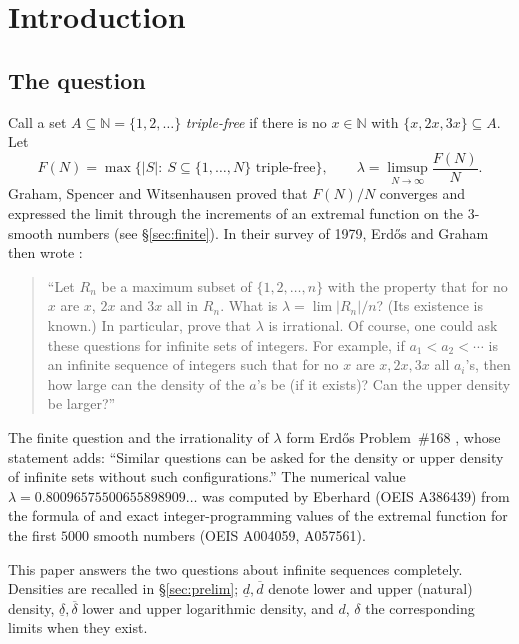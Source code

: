 \documentclass[11pt]{amsart}
\theoremstyle{definition}
\newcommand{\N}{\mathbb{N}}
\newcommand{\dlow}{\underline{d}}
\newcommand{\dup}{\overline{d}}
\newcommand{\llow}{\underline{\delta}}
\newcommand{\lup}{\overline{\delta}}
\begin{document}
\maketitle

\setcounter{tocdepth}{1}
\tableofcontents

\section{Introduction}\label{sec:intro}

\subsection{The question}
Call a set $A\subseteq\N=\{1,2,\dots\}$ \emph{triple-free} if there is no $x\in\N$ with $\{x,2x,3x\}\subseteq A$. Let
\[
F(N)=\max\{|S|:\ S\subseteq\{1,\dots,N\}\text{ triple-free}\},\qquad \lambda=\limsup_{N\to\infty}\frac{F(N)}N .
\]
Graham, Spencer and Witsenhausen \cite{GSW77} proved that $F(N)/N$ converges and expressed the limit through the increments of an extremal function on the $3$-smooth numbers (see \S\ref{sec:finite}). In their survey of 1979, Erd\H{o}s and Graham then wrote \cite[p.~336]{EG79}:

\begin{quote}\small
``Let $R_n$ be a maximum subset of $\{1,2,\dots,n\}$ with the property that for no $x$ are $x$, $2x$ and $3x$ all in $R_n$. What is $\lambda=\lim |R_n|/n$? (Its existence is known.) In particular, prove that $\lambda$ is irrational. Of course, one could ask these questions for infinite sets of integers. For example, if $a_1<a_2<\cdots$ is an infinite sequence of integers such that for no $x$ are $x,2x,3x$ all $a_i$'s, then how large can the density of the $a$'s be (if it exists)? Can the upper density be larger?''
\end{quote}

The finite question and the irrationality of $\lambda$ form Erd\H{o}s Problem~\#168 \cite{EP168}, whose statement adds: ``Similar questions can be asked for the density or upper density of infinite sets without such configurations.'' The numerical value $\lambda=0.80096575500655898909\ldots$ was computed by Eberhard (OEIS A386439) from the formula of \cite{GSW77} and exact integer-programming values of the extremal function for the first $5000$ smooth numbers (OEIS A004059, A057561).

This paper answers the two questions about infinite sequences completely. Densities are recalled in \S\ref{sec:prelim}; $\dlow,\dup$ denote lower and upper (natural) density, $\llow,\lup$ lower and upper logarithmic density, and $d$, $\delta$ the corresponding limits when they exist.
\end{document}
